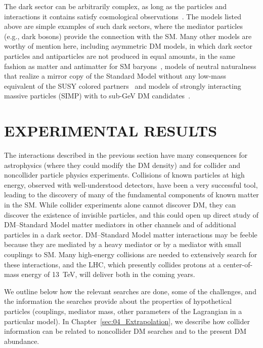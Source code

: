 \documentclass{ar-1col}
\newcommand{\IP}{invisible particle}
\begin{document}
The dark sector can be arbitrarily complex, as long as the
particles and interactions it contains satisfy cosmological
observations~\cite{Strassler:2006im, Evans:2017kti}. The models
listed above are simple examples of such dark sectors, where the
mediator particles (e.g., dark bosons) provide the connection with
the SM. Many other models are worthy of mention here, including
asymmetric DM models, in which dark sector particles and
antiparticles are not produced in equal amounts, in the same
fashion as matter and antimatter for SM
baryons~\cite{Zurek:2013wia}, models of neutral
naturalness that realize a mirror copy of the Standard Model without any
low-mass equivalent of the SUSY colored
partners~\cite{Craig:2014aea} and models of strongly interacting 
massive particles (SIMP) with to sub-GeV DM candidates~\cite{Hochberg:2014dra}.

\section{EXPERIMENTAL RESULTS}\label{sec:03_ExperimentalResults}

The interactions described in the previous section have many
consequences for astrophysics (where they could modify the DM
density) and for collider and noncollider particle physics
experiments.
Collisions of known particles at high energy, observed with
well-understood detectors, have been a very successful tool,
leading to the discovery of many of the fundamental components of
known matter in the SM. While collider experiments alone cannot
discover DM, they can discover {the existence of \IP}s, and this could open up
direct study of DM--Standard Model matter mediators in other channels and of
additional particles in a dark sector. DM--Standard Model matter interactions may be
feeble because they are mediated by a heavy mediator or by a
mediator with small couplings to SM. Many high-energy collisions are needed to extensively search for these interactions, and the
LHC, which presently collides protons at a center-of-mass energy
of 13~TeV, will deliver both in the coming years.

We outline below how the relevant searches are done, some
of the challenges, and the information the searches provide about the properties
of hypothetical particles (couplings, mediator mass, other
parameters of the Lagrangian in a particular model). In Chapter~\ref{sec:04_Extrapolation}, 
we describe how collider information can be related to
noncollider DM searches and to the present DM abundance.
\end{document}
